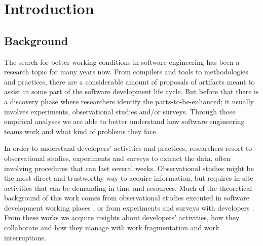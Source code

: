 \chapter{Introduction}

\section{Background}
The search for better working conditions in software engineering has been a research topic for many years now. From compilers and tools to methodologies and practices, there are a considerable amount of proposals of artifacts meant to assist in some part of the software development life cycle. But before that there is a discovery phase where researchers identify the parts-to-be-enhanced; it usually involves experiments, observational studies and/or surveys. Through those empirical analyses we are able to better understand how software engineering teams work and what kind of problems they face.


\begin{changedforreviewerlong}
In order to understand developers' activities and practices, researchers resort to observational studies, experiments and surveys to extract the data, often involving procedures that can last several weeks. Observational studies might be the most direct and trustworthy way to acquire information, but requires in-site activities that can be demanding in time and resources. Much of the theoretical background of this work comes from observational studies executed in software development working places \cite{KMC06, GM04}, or from experiments and surveys with developers \cite{LVD06, PR11}. From these works we acquire insights about developers' activities, how they collaborate and how they manage with work fragmentation and work interruptions.
\end{changedforreviewerlong}

